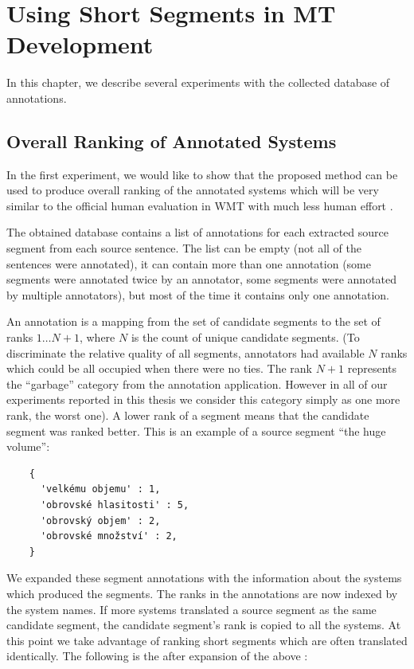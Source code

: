 \chapter{Using Short Segments in MT Development}
\label{chapter:experiments}

In this chapter, we describe several experiments with the collected database of
annotations. 

\section{Overall Ranking of Annotated Systems}
\label{evaluating-annotated-systems}

In the first experiment, we would like to show that the proposed method can be
used to produce overall ranking of the annotated systems which will be very
similar to the official human evaluation in WMT with much less human effort
.

The obtained database contains a list of annotations for each extracted source
segment from each source sentence. The list can be empty (not all of the
sentences were annotated), it can contain more than one annotation (some
segments were annotated twice by an annotator, some segments were annotated by
multiple annotators), but most of the time it contains only one annotation.

An annotation is a mapping from the set of candidate segments to the set of
ranks ${1 \ldots N+1}$, where $N$ is the count of unique candidate segments.
(To discriminate the relative quality of all segments, annotators had available
$N$ ranks which could be all occupied when there were no ties. The rank $N+1$
represents the ``garbage'' category from the annotation application. However in
all of our experiments reported in this thesis we consider this category simply as one
more rank, the worst one). A lower rank of a segment means that the candidate
segment was ranked better. This is an example  of a
source segment ``the huge volume'':

\begin{verbatim}
    {
      'velkému objemu' : 1,
      'obrovské hlasitosti' : 5,
      'obrovský objem' : 2,
      'obrovské množství' : 2,
    }
\end{verbatim}

We expanded these segment annotations with the information about the systems
which produced the segments. The ranks in the annotations are now indexed by
the system names.  If more systems translated a source segment as the same
candidate segment, the candidate segment's rank is copied to all the systems.
At this point we take advantage of ranking short segments which are
often translated identically.  The following is the 
after expansion of the above :

